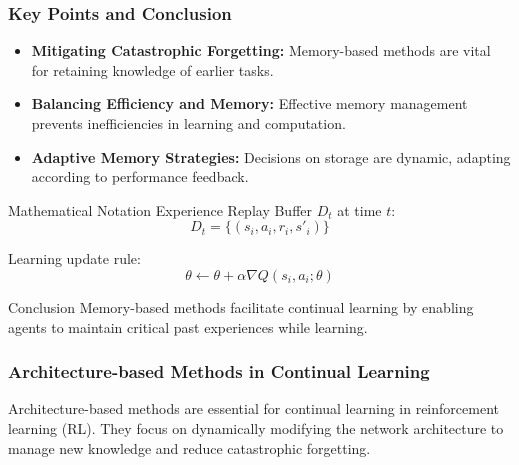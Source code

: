 \documentclass[aspectratio=169]{beamer}
\begin{document}
\begin{frame}[fragile]
    \frametitle{Key Points and Conclusion}
    \begin{itemize}
        \item \textbf{Mitigating Catastrophic Forgetting:} 
        Memory-based methods are vital for retaining knowledge of earlier tasks.
        
        \item \textbf{Balancing Efficiency and Memory:}
        Effective memory management prevents inefficiencies in learning and computation.
        
        \item \textbf{Adaptive Memory Strategies:}
        Decisions on storage are dynamic, adapting according to performance feedback.
    \end{itemize}

    \begin{block}{Mathematical Notation}
        Experience Replay Buffer \( D_t \) at time \( t \):
        \begin{equation}
        D_t = \{ (s_i, a_i, r_i, s'_i) \}
        \end{equation}
        
        Learning update rule:
        \begin{equation}
        \theta \leftarrow \theta + \alpha \nabla Q(s_i, a_i; \theta)
        \end{equation}
    \end{block}

    \begin{block}{Conclusion}
        Memory-based methods facilitate continual learning by enabling agents to maintain critical past experiences while learning.
    \end{block}
\end{frame}

\begin{frame}[fragile]
    \frametitle{Architecture-based Methods in Continual Learning}
    Architecture-based methods are essential for continual learning in reinforcement learning (RL). They focus on dynamically modifying the network architecture to manage new knowledge and reduce catastrophic forgetting.
\end{frame}
\end{document}
